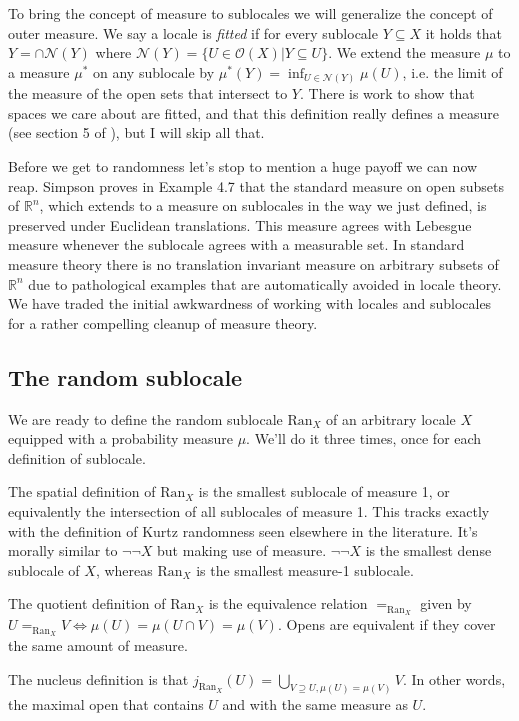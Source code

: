\documentclass[12pt]{extarticle}
\renewcommand{\o}{\ensuremath{\mathcal{O}}}
\newcommand{\ran}{\ensuremath{\mathrm{Ran}}}
\begin{document}
To bring the concept of measure to sublocales we will generalize the concept of outer measure. We say a locale is \emph{fitted} if for every sublocale $Y\subseteq X$ it holds that $Y=\cap\mathcal{N}(Y)$ where $\mathcal{N}(Y)=\{U\in\o(X)|Y\subseteq U\}$. We extend the measure $\mu$ to a measure $\mu^*$ on any sublocale by $\mu^*(Y)=\inf_{U\in\mathcal{N}(Y)}\mu(U)$, i.e. the limit of the measure of the open sets that intersect to $Y$. There is work to show that spaces we care about are fitted, and that this definition really defines a measure (see section 5 of \cite{simpson}), but I will skip all that.

Before we get to randomness let's stop to mention a huge payoff we can now reap. Simpson \cite{simpson} proves in Example 4.7 that the standard measure on open subsets of $\mathbb{R}^n$, which extends to a measure on sublocales in the way we just defined, is preserved under Euclidean translations. This measure agrees with Lebesgue measure whenever the sublocale agrees with a measurable set. In standard measure theory there is no translation invariant measure on arbitrary subsets of $\mathbb{R}^n$ due to pathological examples that are automatically avoided in locale theory. We have traded the initial awkwardness of working with locales and sublocales for a rather compelling cleanup of measure theory.

\subsection{The random sublocale}
We are ready to define the random sublocale $\ran_X$ of an arbitrary locale $X$ equipped with a probability measure $\mu$. We'll do it three times, once for each definition of sublocale.

The spatial definition of $\ran_X$ is the smallest sublocale of measure 1, or equivalently the intersection of all sublocales of measure 1. This tracks exactly with the definition of Kurtz randomness seen elsewhere in the literature. It's morally similar to $\neg\neg X$ but making use of measure. $\neg\neg X$ is the smallest dense sublocale of $X$, whereas $\ran_X$ is the smallest measure-1 sublocale.

The quotient definition of $\ran_X$ is the equivalence relation $=_{\ran_X}$ given by $U=_{\ran_X} V \iff \mu(U)=\mu(U\cap V)=\mu(V)$. Opens are equivalent if they cover the same amount of measure.

The nucleus definition is that $j_{\ran_X}(U) = \bigcup_{V\supseteq U, \mu(U)=\mu(V)}V.$ In other words, the maximal open that contains $U$ and with the same measure as $U$.
\end{document}
